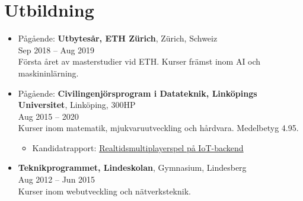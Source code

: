 \documentclass[12pt]{article}
\newcommand{\text}[2]{#2}
\newcommand{\text}[2]{#1}
\begin{document}
\section*{\text{Education}{Utbildning}}
\begin{itemize}
    \item \text{
            In progress: \textbf{Exchange Year, ETH Zürich}, Zürich, Switzerland\\
        }{
            Pågående: \textbf{Utbytesår, ETH Zürich}, Zürich, Schweiz\\
        }
        Sep 2018 -- Aug 2019\\
        \text{
            First year of my master as an exchange student at ETH. Courses mainly in AI and machine learning.
        }{
            Första året av masterstudier vid ETH. Kurser främst inom AI och maskininlärning.
        }

    \item \text{
            In progress: \textbf{Master programme in Computer Science and Engineering (Swedish Civilingenjörsprogram), Linköping University}, Linköping, 300 ECTS\\
        }{
            Pågående: \textbf{Civilingenjörsprogram i Datateknik, Linköpings Universitet}, Linköping, 300HP\\
        }
        Aug 2015 -- 2020\\
        \text{
            Courses in mathematics, software development and hardware. Mean grade of 4.95.
        }{
            Kurser inom matematik, mjukvaruutveckling och hårdvara. Medelbetyg 4.95.
        }
        \begin{itemize}
            \item \text{
                    Bachelor thesis: \href{http://urn.kb.se/resolve?urn=urn:nbn:se:liu:diva-149042}{Real-time Multiplayer Game on IoT-backend}
                }{
                    Kandidatrapport: \href{http://urn.kb.se/resolve?urn=urn:nbn:se:liu:diva-149042}{Realtidsmultiplayerspel på IoT-backend}
                }
        \end{itemize}

    \item \text{
            \textbf{Technology Program, Lindeskolan}, Upper secondary school, Lindesberg\\
        }{
            \textbf{Teknikprogrammet, Lindeskolan}, Gymnasium, Lindesberg\\
        }
        Aug 2012 -- Jun 2015\\
        \text{
            Courses in web development and network technologies.
        }{
            Kurser inom webutveckling och nätverksteknik.
        }

\end{itemize}
\end{document}
